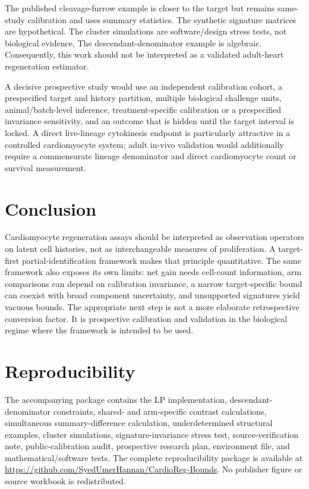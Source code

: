 \documentclass[11pt]{article}
\begin{document}
The published cleavage-furrow example is closer to the target but remains same-study calibration and uses summary statistics. The synthetic signature matrices are hypothetical. The cluster simulations are software/design stress tests, not biological evidence. The descendant-denominator example is algebraic. Consequently, this work should not be interpreted as a validated adult-heart regeneration estimator.

A decisive prospective study would use an independent calibration cohort, a prespecified target and history partition, multiple biological challenge units, animal/batch-level inference, treatment-specific calibration or a prespecified invariance sensitivity, and an outcome that is hidden until the target interval is locked. A direct live-lineage cytokinesis endpoint is particularly attractive in a controlled cardiomyocyte system; adult in-vivo validation would additionally require a commensurate lineage denominator and direct cardiomyocyte count or survival measurement.

\section{Conclusion}
Cardiomyocyte regeneration assays should be interpreted as observation operators on latent cell histories, not as interchangeable measures of proliferation. A target-first partial-identification framework makes that principle quantitative. The same framework also exposes its own limits: net gain needs cell-count information, arm comparisons can depend on calibration invariance, a narrow target-specific bound can coexist with broad component uncertainty, and unsupported signatures yield vacuous bounds. The appropriate next step is not a more elaborate retrospective conversion factor. It is prospective calibration and validation in the biological regime where the framework is intended to be used.

\section*{Reproducibility}
The accompanying package contains the LP implementation, descendant-denominator constraints, shared- and arm-specific contrast calculations, simultaneous summary-difference calculation, underdetermined structural examples, cluster simulations, signature-invariance stress test, source-verification note, public-calibration audit, prospective research plan, environment file, and mathematical/software tests. The complete reproducibility package is available at \url{https://github.com/SyedUmerHannan/CardioReg-Bounds}. No publisher figure or source workbook is redistributed.
\end{document}
